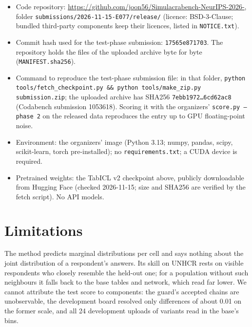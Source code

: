\documentclass{article}
\begin{document}
\begin{itemize}[leftmargin=*]
  \item Code repository: \url{https://github.com/joon56/Simulacrabench-NeurIPS-2026-}, folder
        \texttt{submissions/2026-11-15-E077/release/} (licence: BSD-3-Clause; bundled third-party
        components keep their licences, listed in \texttt{NOTICE.txt}).
  \item Commit hash used for the test-phase submission: \texttt{17565e871703}. The repository holds
        the files of the uploaded archive byte for byte (\texttt{MANIFEST.sha256}).
  \item Command to reproduce the test-phase submission file:
        in that folder, \texttt{python tools/fetch\_checkpoint.py \&\& python tools/make\_zip.py submission.zip};
        the uploaded archive has SHA256 \texttt{7ebb1972\ldots6cd62ac8} (Codabench submission 1053618).
        Scoring it with the organizers' \texttt{score.py --phase 2} on the released data reproduces
        the entry up to GPU floating-point noise.
  \item Environment: the organizers' image (Python 3.13; numpy, pandas, scipy, scikit-learn, torch
        pre-installed); no \texttt{requirements.txt}; a CUDA device is required.
  \item Pretrained weights: the TabICL v2 checkpoint above, publicly downloadable from Hugging Face
        (checked 2026-11-15; size and SHA256 are verified by the fetch script). No API models.
\end{itemize}

\section{Limitations}
\label{sec:limitations}

The method predicts marginal distributions per cell and says nothing about the joint
distribution of a respondent's answers. Its skill on UNHCR rests on visible respondents who
closely resemble the held-out one; for a population without such neighbours it falls back
to the base tables and network, which read far lower. We cannot attribute the test score to
components: the guard's accepted chains are unobservable, the development board resolved
only differences of about 0.01 on the former scale, and all 24 development uploads of
variants read in the base's bins.\label{endmain}



\end{document}
